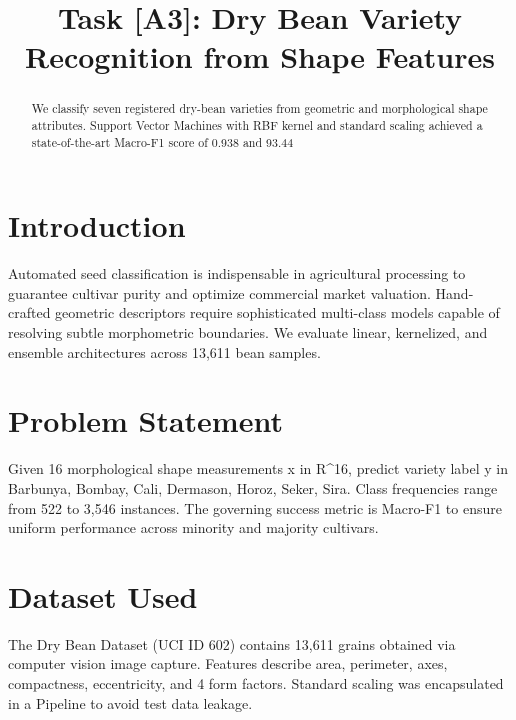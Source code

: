 \documentclass[conference]{IEEEtran}
\begin{document}
\title{Task [A3]: Dry Bean Variety Recognition from Shape Features}

\author{
}

\maketitle

\begin{abstract}
We classify seven registered dry-bean varieties from geometric and morphological shape attributes. Support Vector Machines with RBF kernel and standard scaling achieved a state-of-the-art Macro-F1 score of 0.938 and 93.44%
\end{abstract}

\section{Introduction}
Automated seed classification is indispensable in agricultural processing to guarantee cultivar purity and optimize commercial market valuation. Hand-crafted geometric descriptors require sophisticated multi-class models capable of resolving subtle morphometric boundaries. We evaluate linear, kernelized, and ensemble architectures across 13,611 bean samples.

\section{Problem Statement}
Given 16 morphological shape measurements x in R^16, predict variety label y in {Barbunya, Bombay, Cali, Dermason, Horoz, Seker, Sira}. Class frequencies range from 522 to 3,546 instances. The governing success metric is Macro-F1 to ensure uniform performance across minority and majority cultivars.

\section{Dataset Used}
The Dry Bean Dataset (UCI ID 602) contains 13,611 grains obtained via computer vision image capture. Features describe area, perimeter, axes, compactness, eccentricity, and 4 form factors. Standard scaling was encapsulated in a Pipeline to avoid test data leakage.
\end{document}
